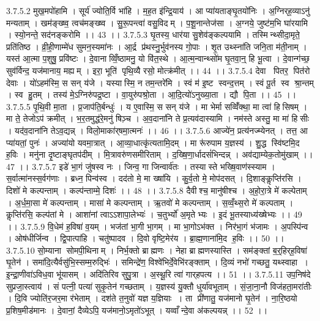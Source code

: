 3.7.5.2
मुख॒मपो॑हामि । सूर्य॑ ज्योति॒र्वि भा॑हि । म॒ह॒त इ॑न्द्रि॒याय॑ । आ प्या॑यताङ्घृ॒तयो॑निः । अ॒ग्निर्‌ह॒व्याऽनु॑ मन्यताम् । खम॑ङ्ख्ष्व॒ त्वच॑मङ्ख्ष्व । सु॒रू॒पन्त्वा॑ वसु॒विदम् । प॒शू॒नान्तेज॑सा । अ॒ग्नये॒ जुष्ट॑म॒भि घा॑रयामि । स्यो॒नन्ते॒ सद॑नङ्करोमि ।। 43 ।।
3.7.5.3
घृ॒तस्य॒ धार॑या सु॒शेव॑ङ्कल्पयामि । तस्मिन्थ्सीदा॒मृते॒ प्रति॑तिष्ठ । व्री॒ही॒णाम्मे॑ध सुमन॒स्यमा॑नः । आ॒र्द्र प्र॑थस्नु॒र्भुव॑नस्य गो॒पाः । शृ॒त उथ्स्ना॑ति जनि॒ता म॑ती॒नाम् । यस्त॑ आ॒त्मा प॒शुषु॒ प्रवि॑ष्टः । दे॒वानाव्विँ॒ष्ठामनु॒ यो वि॑त॒स्थे । आ॒त्म॒न्वान्थ्सो॑म घृ॒तवा॒न्॒ हि भू॒त्वा । दे॒वान्ग॑च्छ॒ सुव॑र्विन्द॒ यज॑मानाय॒ मह्यम् । इरा॒ भूति॑ पृथि॒व्यै रसो॒ मोत्क्र॑मीत् ।। 44 ।।
3.7.5.4
देवा पितर॒ पित॑रो देवाः । यो॑ऽहम॑स्मि॒ स सन् य॑जे । यस्यास्मि॒ न तम॒न्तरे॑मि । स्वं म॑ इ॒ष्ट स्वन्द॒त्तम् । स्वं पू॒र्त स्व श्रा॒न्तम् । स्व हु॒तम् । तस्य॑ मे॒ऽग्निरु॑पद्र॒ष्टा । वा॒युरु॑पश्रो॒ता । आ॒दि॒त्यो॑ऽनुख्या॒ता । द्यौ पि॒ता ।। 45 ।।
3.7.5.5
पृ॒थि॒वी मा॒ता । प्र॒जाप॑ति॒र्बन्धुः॑ । य ए॒वास्मि॒ स सन् य॑जे । मा भेर्मा सव्विँ॑क्था॒ मा त्वा॑ हिसिषम् । मा ते॒ तेजोऽप॑ क्रमीत् । भ॒र॒तमुद्ध॑रे॒मनु॑ षिञ़्च । अ॒व॒दाना॑नि ते प्र॒त्यव॑दास्यामि । नम॑स्ते अस्तु॒ मा मा॑ हिसीः । यद॑व॒दाना॑नि तेऽव॒द्यन्न् । विलो॒माका॑र्‌षमा॒त्मनः॑ ।। 46 ।।
3.7.5.6
आज्ये॑न॒ प्रत्य॑नज्म्येनत् । तत्त॒ आ प्या॑यतां॒ पुनः॑ । अज्या॑यो यवमा॒त्रात् । आ॒व्या॒धात्कृ॑त्यतामि॒दम् । मा रू॑रुपाम य॒ज्ञस्य॑ । शु॒द्ध स्वि॑ष्टमि॒द ह॒विः । मनु॑ना दृ॒ष्टाङ्घृतप॑दीम् । मि॒त्रावरु॑णसमीरिताम् । द॒ख्षि॒णा॒र्धादसं॑भिन्दन्न् । अव॑द्याम्येक॒तोमु॑खाम् ।। 47 ।।
3.7.5.7
इडे॑ भा॒गं जु॑षस्व नः । जिन्व॒ गा जिन्वार्व॑तः । तस्यास्ते भख्षि॒वाण॑स्स्याम । स॒र्वात्मा॑नस्स॒र्वग॑णाः । ब्रध्न॒ पिन्व॑स्व । दद॑तो मे॒ मा ख्षा॑यि । कु॒र्व॒तो मे॒ मोप॑दसत् । दि॒शाङ्कॢप्ति॑रसि । दिशो॑ मे कल्पन्ताम् । कल्प॑न्ताम्मे॒ दिशः॑ ।। 48 ।।
3.7.5.8
दैवीश्च॒ मानु॑षीश्च । अ॒हो॒रा॒त्रे मे॑ कल्पेताम् । अ॒र्ध॒मा॒सा मे॑ कल्पन्ताम् । मासा॑ मे कल्पन्ताम् । ऋ॒तवो॑ मे कल्पन्ताम् । स॒व्वँ॒थ्स॒रो मे॑ कल्पताम् । कॢप्ति॑रसि॒ कल्प॑तां मे । आशा॑नां त्वाऽऽशापा॒लेभ्यः॑ । च॒तुर्भ्यो॑ अ॒मृतेभ्यः । इ॒दं भू॒तस्याध्य॑ख्षेभ्यः ।। 49 ।।
3.7.5.9
वि॒धेम॑ ह॒विषा॑ व॒यम् । भज॑तां भा॒गी भा॒गम् । मा भा॒गोऽभ॑क्त । निर॑भा॒गं भ॑जामः । अ॒पस्पि॑न्व । ओष॑धीर्जिन्व । द्वि॒पात्पा॑हि । चतु॑ष्पादव । दि॒वो वृष्टि॒मेर॑य । ब्रा॒ह्म॒णाना॑मि॒द ह॒विः ।। 50 ।।
3.7.5.10
सो॒म्याना॑ सोमपी॒थिनाम् । निर्भ॒क्तो ब्राह्मणः । नेहा ब्राह्मणस्यास्ति । सम॑ङ्क्तां ब॒र्॒हिर्‌ह॒विषा॑ घृ॒तेन॑ । समा॑दि॒त्यैर्वसु॑भि॒स्सम्म॒रुद्भिः॑ । समिन्द्रे॑ण॒ विश्वे॑भिर्दे॒वेभि॑रङ्क्ताम् । दि॒व्यं नभो॑ गच्छतु॒ यथ्स्वाहा । इ॒न्द्रा॒णीवा॑ऽविध॒वा भू॑यासम् । अदि॑तिरिव सुपु॒त्रा । अ॒स्थू॒रि त्वा॑ गार्‌हपत्य ।। 51 ।।
3.7.5.11
उप॒निष॑दे सुप्रजा॒स्त्वाय॑ । सं पत्नी॒ पत्या॑ सुकृ॒तेन॑ गच्छताम् । य॒ज्ञस्य॑ यु॒क्तौ धुर्या॑वभूताम् । सं॒जा॒ना॒नौ विज॑हता॒मरा॑तीः । दि॒वि ज्योति॑र॒जर॒मा र॑भेताम् । दश॑ते त॒नुवो॑ यज्ञ य॒ज्ञियाः । ता प्री॑णातु॒ यज॑मानो घृ॒तेन॑ । ना॒रि॒ष्ठयो प्र॒शिष॒मीड॑मानः । दे॒वानां॒ दैव्येऽपि॒ यज॑मानो॒ऽमृतो॑ऽभूत् । यव्वाँन्दे॒वा अ॑कल्पयन्न् ।। 52 ।।
